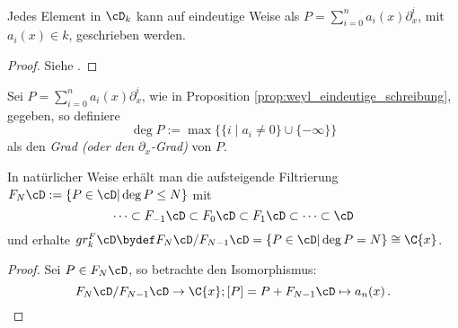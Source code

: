 \begin{prop} \label{prop:weyl_eindeutige_schreibung}
Jedes Element in $\cD_k$ kann auf eindeutige
Weise als $P=\sum_{i=0}^na_i(x)\partial_x^i$, mit $a_i(x)\in k$, geschrieben
werden.
\end{prop}
\begin{proof}
Siehe \cite[Proposition 1.2.3]{sabbah_cimpa90}.
\end{proof}
\begin{comment}
Gilt das folgende??
\[
\alpha_i(x)\partial_x^i \equiv \frac{\alpha_i}{x^i}(x\partial_x)^i \mod
F_{i-1}\cD
\]
\end{comment}

\begin{comment}
Besser?:\\
erst Filtrierung definieren und dadurch dann den Grad?
\end{comment}
\begin{defn}
Sei $P=\sum_{i=0}^na_i(x)\partial_x^i$, wie in Proposition
\ref{prop:weyl_eindeutige_schreibung}, gegeben, so definiere
\[
\deg P:=\max\Big\{\{i\mid a_i\neq 0\}\cup\{-\infty\}\Big\}
\]
als den \emph{Grad (oder den $\partial_x$-Grad)}
von $P$.
\end{defn}
\begin{comment}
Unabhängigkeit von Schreibung? Sabbah Script!
\end{comment}
In natürlicher Weise erhält man die aufsteigende Filtrierung
$F_N\cD:=\{P\in\cD|\deg P\leq N\}$ mit
\[
\cdots\subset F_{-1}\cD\subset F_{0}\cD\subset
F_{1}\cD\subset\cdots\subset\cD
\]
und erhalte $gr_k^F\cD\bydef F_N\cD\slash F_{N-1}\cD
=\{P\in\cD|\deg P=N\}\cong\C\{x\}$.

\begin{proof}
Sei $P\in F_N\cD$, so betrachte den Isomorphismus:
\[
F_N\cD\slash F_{N-1}\cD\rightarrow \C\{x\}; [P]=P+F_{N-1}\cD\mapsto a_n(x) \,.
\]
\end{proof}

\begin{comment}
\begin{prop}
Es gilt:
\begin{center}
\begin{tikzpicture} [descr/.style={fill=white,inner sep=2.5pt}]
\matrix (m) [
  matrix of math nodes,
  row sep=1em,
  text height=1.5ex,
  text depth=0.25ex]
{
  gr^F\cD &
  := \bigoplus_{N\in\Z}gr_N^F\cD = \bigoplus_{N\in\N_0}gr_N^F\cD \cong
  \bigoplus_{N\in\N_0}\C\{x\} \cong \C\{x\}[\xi] = &
  \bigoplus_{N\in\N_0}\C\{x\}\cdot \xi^N \\
};
\path[solid]
(m-1-1) edge [bend right=15] node[descr]{$\cong$}
  node[below]{$\mbox{isomorph als grad. Ringe}$} (m-1-3);
\end{tikzpicture}
\end{center}
also $gr^F\cD \cong \bigoplus_{N\in\N_0}\C\{x\}\cdot \xi^N$ als gradierte
Ringe.
\end{prop}
\begin{proof}
TODO: Treffen?
\end{proof}
\end{comment}

